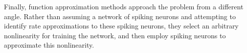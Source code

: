 \noindent Finally, function approximation methods approach the problem from a different angle. Rather than assuming a network of spiking neurons and attempting to identify rate approximations to these spiking neurons, they select an arbitrary nonlinearity for training the network, and then employ spiking neurons to approximate this nonlinearity.







